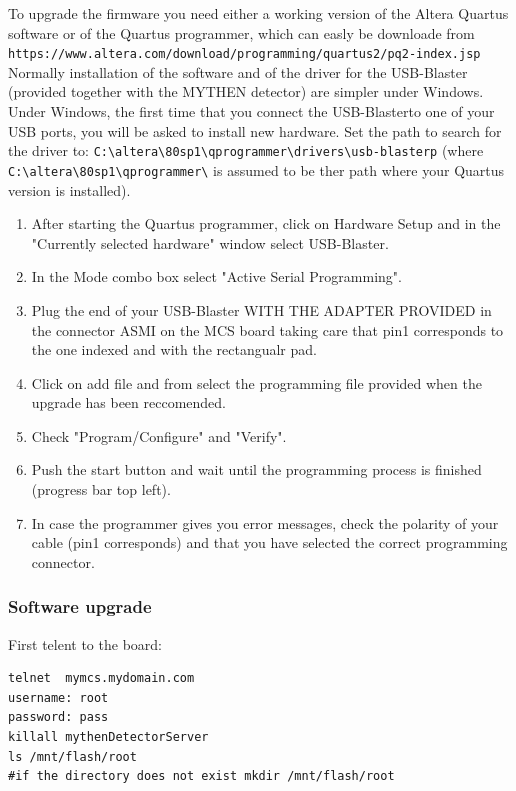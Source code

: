 \documentclass{article}
\begin{document}
To upgrade the firmware you need either a working version of the Altera Quartus software or of the Quartus programmer, which can easly be downloade from \\
\verb=https://www.altera.com/download/programming/quartus2/pq2-index.jsp= \\
Normally installation of the software and of the driver for the USB-Blaster (provided together with the MYTHEN detector) are simpler under Windows.\\
Under Windows, the first time that you connect the USB-Blasterto one of your USB ports, you will be asked to install new hardware. Set the path to search
for the driver to: \verb=C:\altera\80sp1\qprogrammer\drivers\usb-blasterp= (where  \verb=C:\altera\80sp1\qprogrammer\= is assumed to be ther path where your Quartus version is installed).\\
\begin{enumerate}
\item After starting the Quartus programmer, click on Hardware Setup and in the "Currently selected hardware" window select USB-Blaster.
\item In the Mode combo box select "Active Serial Programming".
\item Plug the end of your USB-Blaster WITH THE ADAPTER PROVIDED in the connector ASMI on the MCS board taking care that pin1 corresponds to the one indexed and with the rectangualr pad.
\item Click on add file and from select the programming file provided when the upgrade has been reccomended.
\item Check "Program/Configure" and "Verify".
\item Push the start button and wait until the programming process is finished (progress bar top left).
\item In case the programmer gives you error messages, check the polarity of your cable (pin1 corresponds) and that you have selected the correct programming connector.
\end{enumerate}

\subsubsection{Software upgrade}
First telent to the board:
\begin{verbatim}
telnet  mymcs.mydomain.com
username: root
password: pass
killall mythenDetectorServer
ls /mnt/flash/root
#if the directory does not exist mkdir /mnt/flash/root
\end{verbatim}
\end{document}
